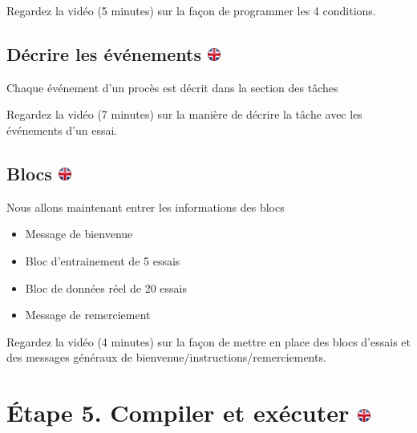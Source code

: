 \documentclass[
]{book}
\providecommand{\tightlist}{%
  \setlength{\itemsep}{0pt}\setlength{\parskip}{0pt}}
\begin{document}
Regardez la vidéo (5 minutes) sur la façon de programmer les 4 conditions.

\hypertarget{duxe9crire-les-uxe9vuxe9nements}{%
\subsection[Décrire les événements ]{\texorpdfstring{Décrire les événements \href{https://www.psytoolkit.org/lessons/project.html\#_describing_events}{\protect\includegraphics{img/ukflag.png}}}{Décrire les événements }}\label{duxe9crire-les-uxe9vuxe9nements}}

Chaque événement d'un procès est décrit dans la section des tâches

Regardez la vidéo (7 minutes) sur la manière de décrire la tâche avec les événements d'un essai.

\hypertarget{blocs}{%
\subsection[Blocs ]{\texorpdfstring{Blocs \href{https://www.psytoolkit.org/lessons/project.html\#_blocks}{\protect\includegraphics{img/ukflag.png}}}{Blocs }}\label{blocs}}

Nous allons maintenant entrer les informations des blocs

\begin{itemize}
\tightlist
\item
  Message de bienvenue
\item
  Bloc d'entrainement de 5 essais
\item
  Bloc de données réel de 20 essais
\item
  Message de remerciement
\end{itemize}

Regardez la vidéo (4 minutes) sur la façon de mettre en place des blocs d'essais et des messages généraux de bienvenue/instructions/remerciements.

\hypertarget{uxe9tape-5.-compiler-et-exuxe9cuter}{%
\section[Étape 5. Compiler et exécuter ]{\texorpdfstring{Étape 5. Compiler et exécuter \href{https://www.psytoolkit.org/lessons/project.html\#_step_5_compile_and_run}{\protect\includegraphics{img/ukflag.png}}}{Étape 5. Compiler et exécuter }}\label{uxe9tape-5.-compiler-et-exuxe9cuter}}
\end{document}
